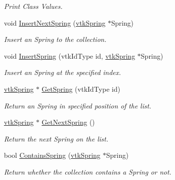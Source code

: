 \begin{DoxyCompactItemize}
\begin{DoxyCompactList}\small\item\em Print Class Values. \item\end{DoxyCompactList}\item 
void \hyperlink{classvtkSpringCollection_a5f4f41081d180270bff00fddf137a64f}{InsertNextSpring} (\hyperlink{classvtkSpring}{vtkSpring} $\ast$Spring)
\begin{DoxyCompactList}\small\item\em Insert an Spring to the collection. \item\end{DoxyCompactList}\item 
void \hyperlink{classvtkSpringCollection_a664f87423429e1acde67f37f835ce13c}{InsertSpring} (vtkIdType id, \hyperlink{classvtkSpring}{vtkSpring} $\ast$Spring)
\begin{DoxyCompactList}\small\item\em Insert an Spring at the specified index. \item\end{DoxyCompactList}\item 
\hyperlink{classvtkSpring}{vtkSpring} $\ast$ \hyperlink{classvtkSpringCollection_a511c3de7caa9127f6c8c580847f80658}{GetSpring} (vtkIdType id)
\begin{DoxyCompactList}\small\item\em Return an Spring in specified position of the list. \item\end{DoxyCompactList}\item 
\hyperlink{classvtkSpring}{vtkSpring} $\ast$ \hyperlink{classvtkSpringCollection_ad62eec63dc1e519ca28f9d2dc96818af}{GetNextSpring} ()
\begin{DoxyCompactList}\small\item\em Return the next Spring on the list. \item\end{DoxyCompactList}\item 
\hypertarget{classvtkSpringCollection_af650a1ef75a036f2988ea59b92abc734}{
bool \hyperlink{classvtkSpringCollection_af650a1ef75a036f2988ea59b92abc734}{ContainsSpring} (\hyperlink{classvtkSpring}{vtkSpring} $\ast$Spring)}
\label{classvtkSpringCollection_af650a1ef75a036f2988ea59b92abc734}

\begin{DoxyCompactList}\small\item\em Return whether the collection contains a Spring or not. \item\end{DoxyCompactList}\end{DoxyCompactItemize}
